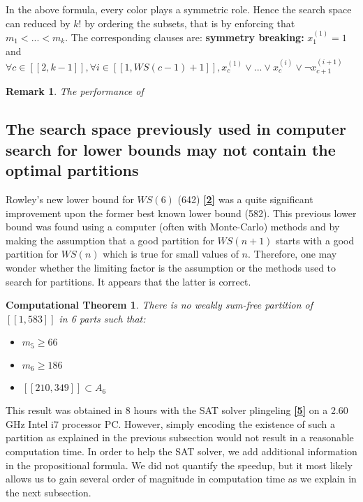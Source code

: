 \documentclass{article}
\newtheorem{computational theorem}{Computational Theorem}[theorem]
\newtheorem{remark}{Remark}[section]
\begin{document}
In the above formula, every color plays a symmetric role. Hence the search space can reduced by \(k!\) by ordering the subsets, that is by 
enforcing that \(m_1 < ... < m_k\). The corresponding clauses are: \linebreak
\textbf{symmetry breaking:}  \(x^{(1)}_1 = 1\) and \(\forall c \in [\![2,k-1]\!], \forall i \in [\![1,WS(c - 1)+1]\!], x^{(1)}_c \lor ... \lor x^{(i)}_c \lor \neg x^{(i+1)}_{c+1}\)

\begin{remark}
The performance of
\end{remark}


\subsection{The search space previously used in computer search for lower bounds may not contain the optimal partitions}

Rowley's new lower bound for \(WS(6)\) (642)  \hyperlink{label2}{\textbf{[2]}} was a quite significant improvement upon the former 
best known lower bound (582). This previous lower bound was found using a computer (often with Monte-Carlo) methods and by making the 
assumption that a good partition for \(WS(n+1)\) starts with a good partition for \(WS(n)\) which is true for small values of \(n\).
Therefore, one may wonder whether the limiting factor is the assumption or the methods used to search for partitions. It appears that 
the latter is correct.

\begin{computational theorem}
There is no weakly sum-free partition of \([\![1,583]\!]\) in 6 parts such that:
\begin{itemize}
	\item \(m_5 \ge 66\)
	\item \(m_6 \ge 186\)
	\item \([\![210,349]\!] \subset A_6\)
\end{itemize}  
\end{computational theorem}

This result was obtained in 8 hours with the SAT solver plingeling \hyperlink{label5}{\textbf{[5]}} on a 2.60 GHz Intel i7 processor PC.
However, simply encoding the existence of such a partition as explained in the previous subsection would not result in a reasonable 
computation time. In order to help the SAT solver, we add additional information in the propositional formula. We did not quantify the 
speedup, but it most likely allows us to gain several order of magnitude in computation time as we explain in the next subsection.
\end{document}
